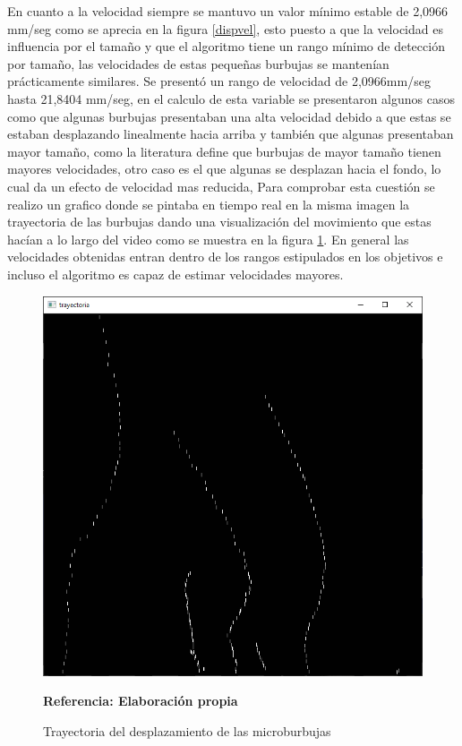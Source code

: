 \documentclass[12pt,twocolumn,a4paper]{article}
\begin{document}
En cuanto a la velocidad siempre se mantuvo un valor mínimo estable de 2,0966 mm/seg como se aprecia en la figura \ref{dispvel}, esto puesto a que la velocidad es influencia por el tamaño y que el algoritmo tiene un rango mínimo de detección por tamaño, las velocidades de estas pequeñas burbujas se mantenían prácticamente similares. Se presentó un rango de velocidad de 2,0966mm/seg hasta 21,8404 mm/seg, en el calculo de esta variable se presentaron algunos casos como que algunas burbujas presentaban una alta velocidad debido a que estas se estaban desplazando linealmente hacia arriba y también que algunas presentaban mayor tamaño, como la literatura define que burbujas de mayor tamaño tienen mayores velocidades, otro caso es el que algunas se desplazan hacia el fondo, lo cual da un efecto de velocidad mas reducida, Para comprobar esta cuestión se realizo un grafico donde se pintaba en tiempo real en la misma imagen la trayectoria de las burbujas dando una visualización del movimiento que estas hacían a lo largo del video como se muestra en la figura \ref{trayectoria}. En general las velocidades obtenidas entran dentro de los rangos estipulados en los objetivos e incluso el algoritmo es capaz de estimar velocidades mayores.

\begin{figure}[h!]
	\centering
	\includegraphics[scale=0.4]{trayectoria.png}
	\caption{Trayectoria del desplazamiento de las microburbujas } \textbf{Referencia: Elaboración propia} 
	\label{trayectoria}
\end{figure}
\end{document}
